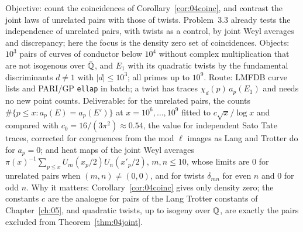 \begin{compproblem}
Objective: count the coincidences of Corollary~\ref{cor:04coinc}, and contrast the joint laws of unrelated pairs with those of twists. Problem~3.3 already tests the independence of unrelated pairs, with twists as a control, by joint Weyl averages and discrepancy; here the focus is the density zero set of coincidences. Objects: $10^3$ pairs of curves of conductor below $10^4$ without complex multiplication that are not isogenous over $\bar{\mathbb{Q}}$, and $E_1$ with its quadratic twists by the fundamental discriminants $d \ne 1$ with $|d| \le 10^3$; all primes up to $10^9$. Route: LMFDB curve lists and PARI/GP \texttt{ellap} in batch; a twist has traces $\chi_d(p)\,a_p(E_1)$ and needs no new point counts. Deliverable: for the unrelated pairs, the counts $\#\{p\le x : a_p(E) = a_p(E')\}$ at $x = 10^6,\dots,10^9$ fitted to $c\sqrt x/\log x$ and compared with $c_0 = 16/(3\pi^2) \approx 0.54$, the value for independent Sato Tate traces, corrected for congruences from the mod $\ell$ images as Lang and Trotter do for $a_p = 0$; and heat maps of the joint Weyl averages $\pi(x)^{-1}\sum_{p\le x}U_m(x_p/2)U_n(x'_p/2)$, $m,n \le 10$, whose limits are $0$ for unrelated pairs when $(m,n)\ne(0,0)$, and for twists $\delta_{mn}$ for even $n$ and $0$ for odd $n$. Why it matters: Corollary~\ref{cor:04coinc} gives only density zero; the constants $c$ are the analogue for pairs of the Lang Trotter constants of Chapter~\ref{ch:05}, and quadratic twists, up to isogeny over $\mathbb{Q}$, are exactly the pairs excluded from Theorem~\ref{thm:04joint}.
\end{compproblem}

